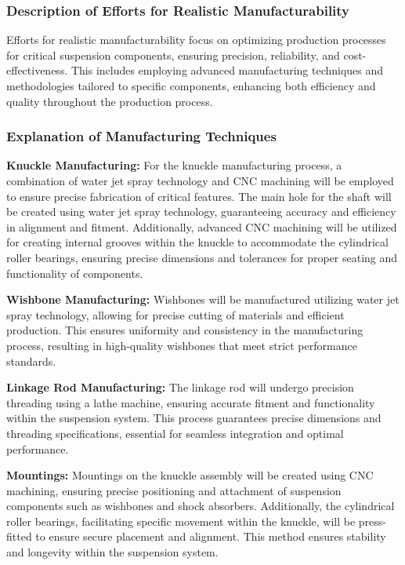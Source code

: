 


\subsubsection{Description of Efforts for Realistic Manufacturability}

Efforts for realistic manufacturability focus on optimizing production processes for critical suspension components, ensuring precision, reliability, and cost-effectiveness. This includes employing advanced manufacturing techniques and methodologies tailored to specific components, enhancing both efficiency and quality throughout the production process.

\subsubsection{Explanation of Manufacturing Techniques}


\textbf{Knuckle Manufacturing:} For the knuckle manufacturing process, a combination of water jet spray technology and CNC machining will be employed to ensure precise fabrication of critical features. The main hole for the shaft will be created using water jet spray technology, guaranteeing accuracy and efficiency in alignment and fitment. Additionally, advanced CNC machining will be utilized for creating internal grooves within the knuckle to accommodate the cylindrical roller bearings, ensuring precise dimensions and tolerances for proper seating and functionality of components.

\textbf{Wishbone Manufacturing:} Wishbones will be manufactured utilizing water jet spray technology, allowing for precise cutting of materials and efficient production. This ensures uniformity and consistency in the manufacturing process, resulting in high-quality wishbones that meet strict performance standards.

\textbf{Linkage Rod Manufacturing:} The linkage rod will undergo precision threading using a lathe machine, ensuring accurate fitment and functionality within the suspension system. This process guarantees precise dimensions and threading specifications, essential for seamless integration and optimal performance.

\textbf{Mountings:} Mountings on the knuckle assembly will be created using CNC machining, ensuring precise positioning and attachment of suspension components such as wishbones and shock absorbers. Additionally, the cylindrical roller bearings, facilitating specific movement within the knuckle, will be press-fitted to ensure secure placement and alignment. This method ensures stability and longevity within the suspension system.

